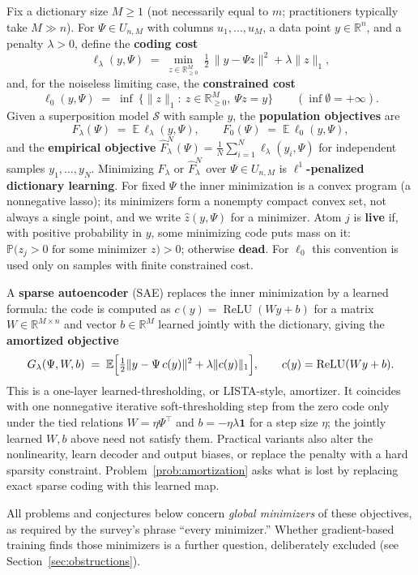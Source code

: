 \documentclass[11pt]{amsart}
\theoremstyle{plain}
\theoremstyle{definition}
\newcommand{\R}{\mathbb{R}}
\newcommand{\E}{\mathbb{E}}
\newcommand{\pr}{\mathbb{P}}
\DeclareMathOperator{\relu}{ReLU}
\begin{document}
Fix a dictionary size $M\ge 1$ (not necessarily equal to $m$; practitioners typically take $M\gg n$). For $\Psi\in U_{n,M}$ with columns $u_1,\dots,u_M$, a data point $y\in\R^n$, and a penalty $\lambda>0$, define the \textbf{coding cost}
\[
  \ell_\lambda(y,\Psi)\;=\;\min_{z\in\R^M_{\ge0}}\ \tfrac12\,\lVert y-\Psi z\rVert^2+\lambda\lVert z\rVert_1,
\]
and, for the noiseless limiting case, the \textbf{constrained cost}
\[
  \ell_0(y,\Psi)\;=\;\inf\ \bigl\{\lVert z\rVert_1 :\ z\in\R^M_{\ge0},\ \Psi z=y\bigr\}\qquad(\inf\emptyset=+\infty).
\]
Given a superposition model $\mathcal{S}$ with sample $y$, the \textbf{population objectives} are
\[
  F_\lambda(\Psi)\;=\;\E\,\ell_\lambda(y,\Psi),
  \qquad
  F_0(\Psi)\;=\;\E\,\ell_0(y,\Psi),
\]
and the \textbf{empirical objective} $\widehat F^N_\lambda(\Psi)=\frac1N\sum_{i=1}^N \ell_\lambda(y_i,\Psi)$ for independent samples $y_1,\dots,y_N$. Minimizing $F_\lambda$ or $\widehat F^N_\lambda$ over $\Psi\in U_{n,M}$ is \textbf{$\ell^1$-penalized dictionary learning}. For fixed $\Psi$ the inner minimization is a convex program (a nonnegative lasso); its minimizers form a nonempty compact convex set, not always a single point, and we write $\hat z(y,\Psi)$ for a minimizer. Atom $j$ is \textbf{live} if, with positive probability in $y$, some minimizing code puts mass on it: $\pr\bigl(z_j>0\text{ for some minimizer }z\bigr)>0$; otherwise \textbf{dead}. For $\ell_0$ this convention is used only on samples with finite constrained cost.

A \textbf{sparse autoencoder} (SAE) \cite{bricken2023,cunningham2023} replaces the inner minimization by a learned formula: the code is computed as $c(y)=\relu(Wy+b)$ for a matrix $W\in\R^{M\times n}$ and vector $b\in\R^M$ learned jointly with the dictionary, giving the \textbf{amortized objective}
\[
  G_\lambda(\Psi,W,b)\;=\;\E\Bigl[\tfrac12\lVert y-\Psi\,c(y)\rVert^2+\lambda\lVert c(y)\rVert_1\Bigr],\qquad c(y)=\relu(Wy+b).
\]
This is a one-layer learned-thresholding, or LISTA-style, amortizer. It coincides with one nonnegative iterative soft-thresholding step \cite{daubechies2004} from the zero code only under the tied relations $W=\eta\Psi^\top$ and $b=-\eta\lambda\mathbf 1$ for a step size $\eta$; the jointly learned $W,b$ above need not satisfy them. Practical variants also alter the nonlinearity, learn decoder and output biases, or replace the penalty with a hard sparsity constraint. Problem~\ref{prob:amortization} asks what is lost by replacing exact sparse coding with this learned map.

All problems and conjectures below concern \emph{global minimizers} of these objectives, as required by the survey's phrase ``every minimizer.'' Whether gradient-based training finds those minimizers is a further question, deliberately excluded (see Section~\ref{sec:obstructions}).
\end{document}
